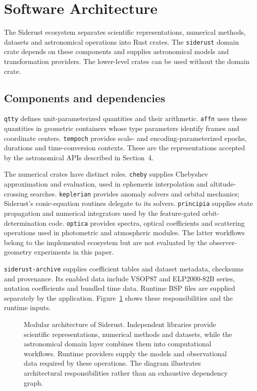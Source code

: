 \section{Software Architecture}

The Siderust ecosystem separates scientific representations, numerical methods, datasets and
astronomical operations into Rust crates. The \texttt{siderust} domain crate depends on these
components and supplies astronomical models and transformation providers. The lower-level crates
can be used without the domain crate.

\subsection{Components and dependencies}

\texttt{qtty} defines unit-parameterized quantities and their arithmetic. \texttt{affn} uses these
quantities in geometric containers whose type parameters identify frames and coordinate centers.
\texttt{tempoch} provides scale- and encoding-parameterized epochs, durations and time-conversion
contexts. These are the representations accepted by the astronomical APIs described in Section~4.

The numerical crates have distinct roles. \texttt{cheby} supplies Chebyshev approximation and
evaluation, used in ephemeris interpolation and altitude-crossing searches. \texttt{keplerian}
provides anomaly solvers and orbital mechanics; Siderust's conic-equation routines delegate to its
solvers. \texttt{principia} supplies state propagation and numerical integrators used by the
feature-gated orbit-determination code. \texttt{optica} provides spectra, optical coefficients and
scattering operations used in photometric and atmospheric modules. The latter workflows belong to
the implemented ecosystem but are not evaluated by the observer-geometry experiments in this paper.

\texttt{siderust-archive} supplies coefficient tables and dataset metadata, checksums and provenance.
Its enabled data include VSOP87 and ELP2000-82B series, nutation coefficients and bundled time data.
Runtime BSP files are supplied separately by the application. Figure~\ref{fig:architecture-overview}
shows these responsibilities and the runtime inputs.

\begin{figure}[!tbp]
    \centering
    
    \caption{Modular architecture of Siderust. Independent libraries
        provide scientific representations, numerical methods and
        datasets, while the astronomical domain layer combines them
        into computational workflows. Runtime providers supply the
        models and observational data required by these operations.
        The diagram illustrates architectural responsibilities rather
        than an exhaustive dependency graph.}
    \label{fig:architecture-overview}
\end{figure}

